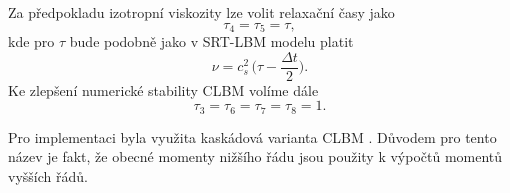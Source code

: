 Za předpokladu izotropní viskozity lze volit relaxační časy jako
\begin{equation}
\tau_{4} = \tau_{5} = \tau,
\end{equation}
kde pro $ \tau $ bude podobně jako v SRT-LBM modelu platit
\begin{equation}\label{eq:tauclbm}
\nu = c^{2}_{s} \, \Bigg( \tau  - \frac{\Delta t}{2} \Bigg).
\end{equation}
Ke zlepšení numerické stability CLBM \cite{GeierCLBM} volíme dále
\begin{equation}
\tau_{3} = \tau_{6} = \tau_{7} = \tau_{8} = 1.
\end{equation}

Pro implementaci byla využita kaskádová varianta CLBM \cite{GeierCLBM}. Důvodem pro tento název je fakt, že obecné momenty nižšího řádu jsou použity k výpočtů momentů vyšších řádů.

